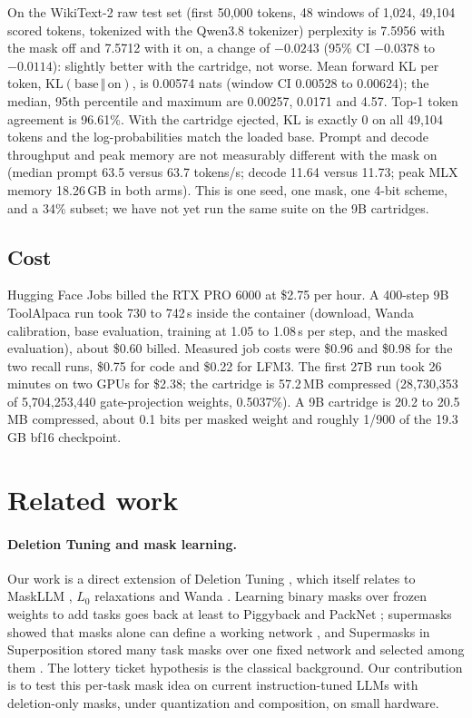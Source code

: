 \documentclass[11pt]{article}
\begin{document}
On the WikiText-2 raw test set (first 50,000 tokens, 48 windows of 1,024, 49,104 scored tokens, tokenized with the Qwen3.8 tokenizer) perplexity is 7.5956 with the mask off and 7.5712 with it on, a change of $-0.0243$ (95\% CI $-0.0378$ to $-0.0114$): slightly better with the cartridge, not worse. Mean forward KL per token, $\mathrm{KL}(\text{base}\,\Vert\,\text{on})$, is 0.00574 nats (window CI 0.00528 to 0.00624); the median, 95th percentile and maximum are 0.00257, 0.0171 and 4.57. Top-1 token agreement is 96.61\%. With the cartridge ejected, KL is exactly 0 on all 49,104 tokens and the log-probabilities match the loaded base. Prompt and decode throughput and peak memory are not measurably different with the mask on (median prompt 63.5 versus 63.7 tokens/s; decode 11.64 versus 11.73; peak MLX memory 18.26\,GB in both arms). This is one seed, one mask, one 4-bit scheme, and a 34\% subset; we have not yet run the same suite on the 9B cartridges.

\subsection{Cost}
\label{sec:cost}

Hugging Face Jobs billed the RTX PRO 6000 at \$2.75 per hour. A 400-step 9B ToolAlpaca run took 730 to 742\,s inside the container (download, Wanda calibration, base evaluation, training at 1.05 to 1.08\,s per step, and the masked evaluation), about \$0.60 billed. Measured job costs were \$0.96 and \$0.98 for the two recall runs, \$0.75 for code and \$0.22 for LFM3. The first 27B run took 26 minutes on two GPUs for \$2.38; the cartridge is 57.2\,MB compressed (28,730,353 of 5,704,253,440 gate-projection weights, 0.5037\%). A 9B cartridge is 20.2 to 20.5\,MB compressed, about 0.1 bits per masked weight and roughly 1/900 of the 19.3\,GB bf16 checkpoint.

\section{Related work}
\label{sec:related}

\paragraph{Deletion Tuning and mask learning.} Our work is a direct extension of Deletion Tuning \citep{lu2026deleting}, which itself relates to MaskLLM \citep{fang2024maskllm}, $L_0$ relaxations \citep{louizos2017l0} and Wanda \citep{sun2023wanda}. Learning binary masks over frozen weights to add tasks goes back at least to Piggyback \citep{mallya2018piggyback} and PackNet \citep{mallya2017packnet}; supermasks showed that masks alone can define a working network \citep{ramanujan2019hidden}, and Supermasks in Superposition stored many task masks over one fixed network and selected among them \citep{wortsman2020supsup}. The lottery ticket hypothesis \citep{frankle2018lottery} is the classical background. Our contribution is to test this per-task mask idea on current instruction-tuned LLMs with deletion-only masks, under quantization and composition, on small hardware.
\end{document}
